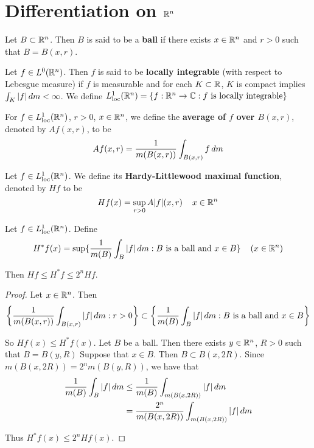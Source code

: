 \documentclass{book}
\begin{document}
	


	
	
	\newpage
	\section{Differentiation on $\mathbb{R}^n$}
	
	\begin{defn}  
		Let $B \subset \mathbb{R}^n$. Then $B$ is said to be a \textbf{ball} if there exists $x \in \mathbb{R}^n$ and $r > 0$ such that $B = B(x, r)$. 
	\end{defn}
	
	\begin{defn}  
		Let $f \in L^0(\mathbb{R}^n)$. Then $f$ is said to be \textbf{locally integrable} (with respect to Lebesgue measure) if $f$ is measurable and for each $K \subset \mathbb{R}$, $K$ is compact implies $\int_K |f| \, d m < \infty$. We define $L^1_{\text{loc}}(\mathbb{R}^n) = \{f:\mathbb{R}^n \rightarrow \mathbb{C}: f \text{ is locally integrable}\}$
	\end{defn}
	
	\begin{defn}  
		For $f \in L^1_{\text{loc}}(\mathbb{R}^n)$, $r>0$, $x \in \mathbb{R}^n$, we define the \textbf{average of $f$ over $B(x,r)$}, denoted by $Af(x,r)$, to be $$Af(x,r) = \frac{1}{m(B(x,r))}\int_{B(x,r)}f\, d m$$
	\end{defn}

	\begin{defn}  
		Let $f \in L^1_{\text{loc}}(\mathbb{R}^n)$. We define its \textbf{Hardy-Littlewood maximal function}, denoted by $Hf$ to be $$Hf(x) = \sup_{r>0} A|f|(x,r) \hspace{4mm} x \in \mathbb{R}^n$$
	\end{defn}
	
	\begin{ex}  
		Let $f \in L^1_{\text{loc}}(\mathbb{R}^n)$. Define $$H^*f(x) = \sup\{\frac{1}{m(B)}\int_{B}|f|\, d m: B \text{ is a ball and } x \in B\} \hspace{4mm} (x \in \mathbb{R}^n)$$
		
		Then $Hf \leq H^*f \leq 2^n Hf$. 
	\end{ex}
	
	\begin{proof}
		Let $x \in \mathbb{R}^n$. Then $$\bigg \{ \frac{1}{m(B(x,r))}\int_{B(x,r)}|f|\, d m: r >0\bigg \} \subset \bigg\{ \frac{1}{m(B)}\int_{B}|f|\, d m: B \text{ is a ball and } x \in B \bigg\} $$
		
		So $Hf(x) \leq H^*f(x)$. Let $B$ be a ball. Then there exists $y \in \mathbb{R}^n$, $R>0$ such that $B = B(y,R)$ Suppose that $x \in B$. Then $B \subset B(x,2R)$. Since $m(B(x,2R)) = 2^n m(B(y,R))$, we have that 
		\begin{align*}
			\frac{1}{m(B)}\int_{B}|f|\, d m
			& \leq \frac{1}{m(B)} \int_{m(B(x,2R))}|f|\, d m\\
			&= \frac{2^n}{m(B(x,2R))} \int_{m(B(x,2R))}|f|\, d m
		\end{align*}
		
		Thus $H^*f(x) \leq 2^n Hf(x)$.
	\end{proof}
	
\end{document}
